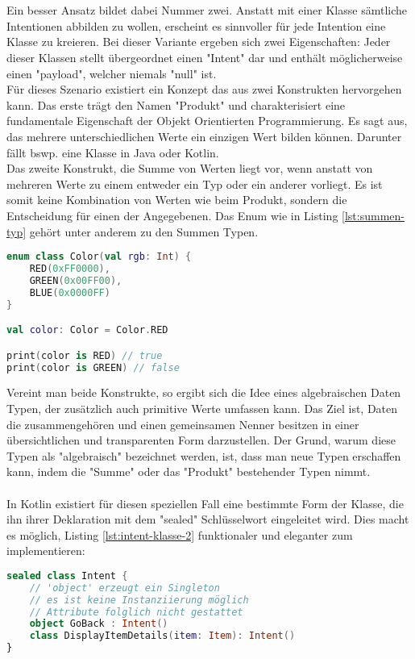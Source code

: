 \\
\\
Ein besser Ansatz bildet dabei Nummer zwei. Anstatt mit einer Klasse sämtliche Intentionen abbilden zu wollen, erscheint es sinnvoller für jede Intention eine Klasse zu kreieren. Bei dieser Variante ergeben sich zwei Eigenschaften: Jeder dieser Klassen stellt übergeordnet einen "Intent" dar und enthält möglicherweise einen "payload", welcher niemals "null" ist.
\\
Für dieses Szenario existiert ein Konzept das aus zwei Konstrukten hervorgehen kann. Das erste trägt den Namen "Produkt" und charakterisiert eine fundamentale Eigenschaft der Objekt Orientierten Programmierung. Es sagt aus, das mehrere unterschiedlichen Werte ein einzigen Wert bilden können. Darunter fällt bswp. eine Klasse in Java oder Kotlin.
\\
Das zweite Konstrukt, die Summe von Werten liegt vor, wenn anstatt von mehreren Werte zu einem entweder ein Typ oder ein anderer vorliegt. Es ist somit keine Kombination von Werten wie beim Produkt, sondern die Entscheidung für einen der Angegebenen. Das Enum wie in Listing
\ref{lst:summen-typ}
gehört unter anderem zu den Summen Typen.
\begin{lstlisting}[caption={Summen Typ}, label={lst:summen-typ}, language=Kotlin]
enum class Color(val rgb: Int) {
	RED(0xFF0000),
	GREEN(0x00FF00),
	BLUE(0x0000FF)
}

val color: Color = Color.RED

print(color is RED) // true
print(color is GREEN) // false
\end{lstlisting}
\bigskip
Vereint man beide Konstrukte, so ergibt sich die Idee eines algebraischen Daten Typen, der zusätzlich 
auch primitive Werte umfassen kann. Das Ziel ist, Daten die zusammengehören und einen gemeinsamen Nenner 
besitzen in einer übersichtlichen und transparenten Form darzustellen. Der Grund, warum diese Typen als 
"algebraisch" bezeichnet werden, ist, dass man neue Typen erschaffen kann, indem die "Summe" oder das 
"Produkt" bestehender Typen nimmt.
\\
\\
In Kotlin existiert für diesen speziellen Fall eine bestimmte Form der Klasse, die ihn ihrer Deklaration mit dem "sealed" Schlüsselwort eingeleitet wird. Dies macht es möglich, Listing 
\ref{lst:intent-klasse-2}
funktionaler und eleganter zum implementieren:
\begin{lstlisting}[caption={Intents als sealded class}, label={lst:intents-sealed-class}, language=Kotlin]
sealed class Intent {
	// 'object' erzeugt ein Singleton
	// es ist keine Instanziierung möglich
	// Attribute folglich nicht gestattet
	object GoBack : Intent()
	class DisplayItemDetails(item: Item): Intent()
}
\end{lstlisting}
